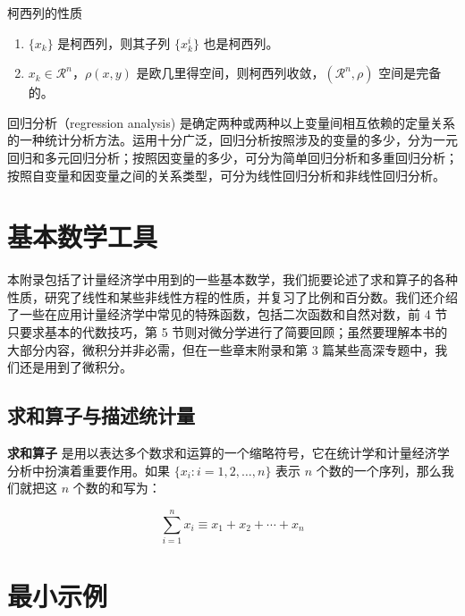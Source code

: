 \documentclass[cn,11pt,fancy]{elegantbook}
\begin{document}
\begin{property}
柯西列的性质
\begin{enumerate}
\item $\{x_k\}$ 是柯西列，则其子列 $\{x_k^i\}$ 也是柯西列。
\item $x_k\in \mathcal{R}^n$，$\rho(x,y)$ 是欧几里得空间，则柯西列收敛，$(\mathcal{R}^n,\rho)$ 空间是完备的。
\end{enumerate}
\end{property}

\begin{conclusion}
回归分析（regression analysis) 是确定两种或两种以上变量间相互依赖的定量关系的一种统计分析方法。运用十分广泛，回归分析按照涉及的变量的多少，分为一元回归和多元回归分析；按照因变量的多少，可分为简单回归分析和多重回归分析；按照自变量和因变量之间的关系类型，可分为线性回归分析和非线性回归分析。
\end{conclusion}


\nocite{*} 



\appendix
\chapter{基本数学工具}

本附录包括了计量经济学中用到的一些基本数学，我们扼要论述了求和算子的各种性质，研究了线性和某些非线性方程的性质，并复习了比例和百分数。我们还介绍了一些在应用计量经济学中常见的特殊函数，包括二次函数和自然对数，前 4 节只要求基本的代数技巧，第 5 节则对微分学进行了简要回顾；虽然要理解本书的大部分内容，微积分并非必需，但在一些章末附录和第 3 篇某些高深专题中，我们还是用到了微积分。

\section{求和算子与描述统计量}

\textbf{求和算子} 是用以表达多个数求和运算的一个缩略符号，它在统计学和计量经济学分析中扮演着重要作用。如果 $\{x_i: i=1, 2, \ldots, n\}$ 表示 $n$ 个数的一个序列，那么我们就把这 $n$ 个数的和写为：

\begin{equation}
\sum_{i=1}^n x_i \equiv x_1 + x_2 +\cdots + x_n
\end{equation}


\chapter{最小示例}
\end{document}
